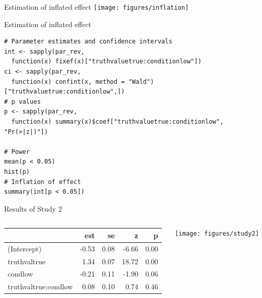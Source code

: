 \documentclass[aspectratio=169]{beamer}
\begin{document}
\begin{frame}{Estimation of inflated effect}
  \texttt{[image: figures/inflation]}
\end{frame}

{

\begin{frame}[fragile]{Estimation of inflated effect}
\begin{lstlisting}
# Parameter estimates and confidence intervals
int <- sapply(par_rev, 
  function(x) fixef(x)["truthvaluetrue:conditionlow"])
ci <- sapply(par_rev, 
  function(x) confint(x, method = "Wald")["truthvaluetrue:conditionlow",])
# p values
p <- sapply(par_rev, 
  function(x) summary(x)$coef["truthvaluetrue:conditionlow", "Pr(>|z|)"])

# Power
mean(p < 0.05)
hist(p)
# Inflation of effect
summary(int[p < 0.05])
\end{lstlisting}
\end{frame}

}

\begin{frame}{Results of Study 2}
  \begin{columns}
    \begin{column}[c]{.5\textwidth}
      {\footnotesize
      \begin{tabular}{@{}lrrrr@{}}
  \hline
 & est & se & z & p \\ 
  \hline
(Intercept) & -0.53 & 0.08 & -6.66 & 0.00 \\ 
  truthvaltrue & 1.34 & 0.07 & 18.72 & 0.00 \\ 
  condlow & -0.21 & 0.11 & -1.90 & 0.06 \\ 
  truthvaltrue:condlow & 0.08 & 0.10 & 0.74 & 0.46 \\ 
   \hline
\end{tabular}
      }
    \end{column}
    \begin{column}[c]{.5\textwidth}
      \texttt{[image: figures/study2]}
    \end{column}
  \end{columns}
\end{frame}
\end{document}
